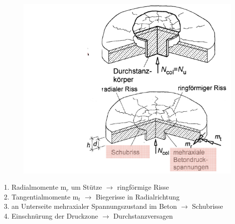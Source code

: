\begin{minipage}{0.5\linewidth}
		\begin{figure}
			\includegraphics[width=\linewidth]{images/PilzFlach2Schnittkrat.PNG}
		\end{figure}
	
		1. Radialmomente m$_r$ um Stütze $\rightarrow$ ringförmige Risse \\
		2. Tangentialmomente m$_t$ $\rightarrow$ Biegerisse in Radialrichtung \\
		3. an Unterseite mehraxialer Spannungszustand im Beton $\rightarrow$ Schubrisse \\
		4. Einschnürung der Druckzone $\rightarrow$ Durchstanzversagen
			
	\end{minipage}
